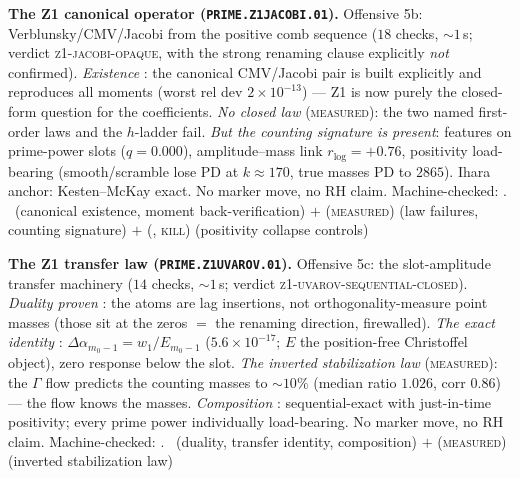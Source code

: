 \documentclass[11pt,a4paper]{article}
\theoremstyle{definition}
\begin{document}
\par\smallskip\noindent\textbf{The Z1 canonical operator
(\texttt{PRIME.Z1JACOBI.01}).}
Offensive 5b: Verblunsky/CMV/Jacobi from the positive comb sequence
($18$ checks, ${\sim}1$\,s; verdict \textsc{z1-jacobi-opaque}, with
the strong renaming clause explicitly \emph{not} confirmed).
\emph{Existence} \mE: the canonical CMV/Jacobi pair is built
explicitly and reproduces all moments (worst rel dev
$2\times10^{-13}$) --- Z1 is now purely the closed-form question for
the coefficients.  \emph{No closed law} (\textsc{measured}): the two
named first-order laws and the $h$-ladder fail.  \emph{But the
counting signature is present}: features on prime-power slots
($q=0.000$), amplitude--mass link $r_{\log}=+0.76$, positivity
load-bearing (smooth/scramble lose PD at $k\approx170$, true masses
PD to $2865$).  Ihara anchor: Kesten--McKay exact.  No marker move,
no RH claim.
Machine-checked: .
\mE\ (canonical existence, moment back-verification) $+$
(\textsc{measured}) (law failures, counting signature) $+$ (\mE,
\textsc{kill}) (positivity collapse controls)
\par\smallskip

\par\smallskip\noindent\textbf{The Z1 transfer law
(\texttt{PRIME.Z1UVAROV.01}).}
Offensive 5c: the slot-amplitude transfer machinery ($14$ checks,
${\sim}1$\,s; verdict \textsc{z1-uvarov-sequential-closed}).
\emph{Duality proven} \mE: the atoms are lag insertions, not
orthogonality-measure point masses (those sit at the zeros $=$ the
renaming direction, firewalled).  \emph{The exact identity} \mE:
$\Delta\alpha_{m_0-1}=w_1/E_{m_0-1}$ ($5.6\times10^{-17}$; $E$ the
position-free Christoffel object), zero response below the slot.
\emph{The inverted stabilization law} (\textsc{measured}): the
$\Gamma$ flow predicts the counting masses to ${\sim}10\%$ (median
ratio $1.026$, corr $0.86$) --- the flow knows the masses.
\emph{Composition} \mE: sequential-exact with just-in-time
positivity; every prime power individually load-bearing.  No marker
move, no RH claim.
Machine-checked: .
\mE\ (duality, transfer identity, composition) $+$
(\textsc{measured}) (inverted stabilization law)
\par\smallskip
\end{document}
